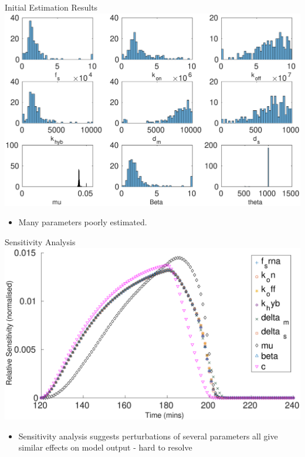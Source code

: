 \documentclass{beamer}
\begin{document}
\begin{frame}{Initial Estimation Results}
  \includegraphics[scale = 0.25, clip = true, trim = 0 0 0 0]{Figures/13_9_hist}
        \begin{itemize}
    \item Many parameters poorly estimated.
            \end{itemize}
\end{frame}

\begin{frame}{Sensitivity Analysis}
  \includegraphics[scale = 0.2, clip = true, trim = 00 0 0 0]{Figures/Sensitivty_scaled_other}
  \vspace{-2mm}
          \begin{itemize}
    \item Sensitivity analysis suggests perturbations of several parameters all give similar effects on model output - \alert{hard to resolve}
            \end{itemize}
\end{frame}
\end{document}
